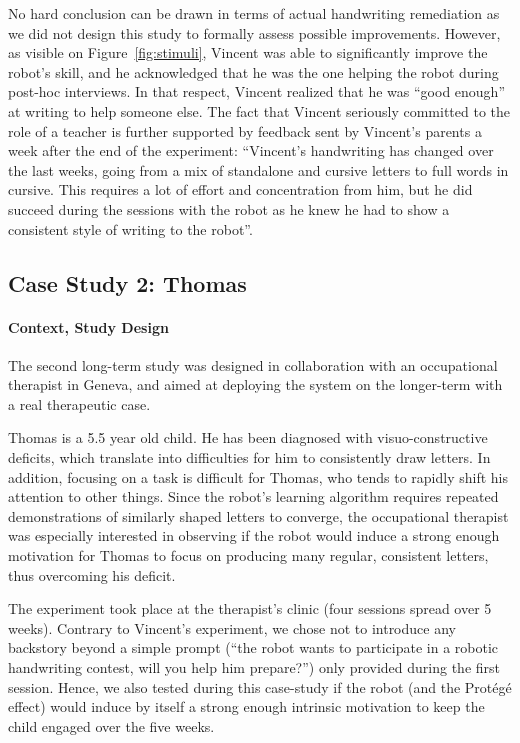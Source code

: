 \documentclass{article}
\begin{document}
No hard conclusion can be drawn in terms of actual handwriting remediation as we
did not design this study to formally assess possible improvements. However, as
visible on Figure~\ref{fig:stimuli}, Vincent was able to significantly improve
the robot's skill, and  he acknowledged that he was the one helping the robot
during post-hoc interviews. In that respect, Vincent realized that he was ``good
enough'' at writing to help someone else. The fact that Vincent seriously
committed to the role of a teacher is further supported by feedback sent by
Vincent's parents a week after the end of the experiment: ``Vincent's
handwriting has changed over the last weeks, going from a mix of standalone and
cursive letters to full words in cursive. This requires a lot of effort and
concentration from him, but he did succeed during the sessions with the robot as
he knew he had to show a consistent style of writing to the robot''.


\subsection{Case Study 2: Thomas}
\label{thomas}

\paragraph{Context, Study Design}

The second long-term study was designed in collaboration with an occupational
therapist in Geneva, and aimed at deploying the system on the longer-term with a
real therapeutic case.

Thomas is a 5.5 year old child. He has been diagnosed with visuo-constructive
deficits, which translate into difficulties for him to consistently draw
letters. In addition, focusing on a task is difficult for Thomas, who tends to
rapidly shift his attention to other things. Since the robot's learning
algorithm requires repeated demonstrations of similarly shaped letters to
converge, the occupational therapist was especially interested in observing if
the robot would induce a strong enough motivation for Thomas to focus on
producing many regular, consistent letters, thus overcoming his deficit.

The experiment took place at the therapist's clinic (four sessions spread
over 5 weeks). Contrary to Vincent's experiment, we chose not to introduce any
backstory beyond a simple prompt (``the robot wants to participate in a robotic
handwriting contest, will you help him prepare?'') only provided during the
first session. Hence, we also tested during this case-study if the robot (and
the Protégé effect) would induce by itself a strong enough intrinsic motivation
to keep the child engaged over the five weeks.
\end{document}
